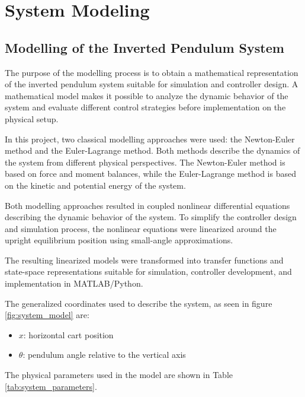 \chapter{System Modeling}
\label{chap:system modeling}
\section{Modelling of the Inverted Pendulum System}


The purpose of the modelling process is to obtain a mathematical representation of the inverted pendulum system suitable for simulation and controller design. A mathematical model makes it possible to analyze the dynamic behavior of the system and evaluate different control strategies before implementation on the physical setup.

In this project, two classical modelling approaches were used: the Newton-Euler method and the Euler-Lagrange method. Both methods describe the dynamics of the system from different physical perspectives. The Newton-Euler method is based on force and moment balances, while the Euler-Lagrange method is based on the kinetic and potential energy of the system.

Both modelling approaches resulted in coupled nonlinear differential equations describing the dynamic behavior of the system. To simplify the controller design and simulation process, the nonlinear equations were linearized around the upright equilibrium position using small-angle approximations.

The resulting linearized models were transformed into transfer functions and state-space representations suitable for simulation, controller development, and implementation in MATLAB/Python.

The generalized coordinates used to describe the system, as seen in figure \ref{fig:system_model} are:
\begin{itemize}[noitemsep]
	\item $x$: horizontal cart position
	\item $\theta$: pendulum angle relative to the vertical axis
\end{itemize}

The physical parameters used in the model are shown in Table \ref{tab:system_parameters}.

